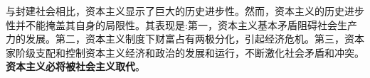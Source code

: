 {与封建社会相比，资本主义显示了巨大的历史进步性。然而，资本主义的历史进步性并不能掩盖其自身的局限性。其表现是:第一，资本主义基本矛盾阻碍社会生产力的发展。第二，资本主义制度下财富占有两极分化，引起经济危机。第三，资本家阶级支配和控制资本主义经济和政治的发展和运行，不断激化社会矛盾和冲突。}\textbf{资本主义必将被社会主义取代}{。}
